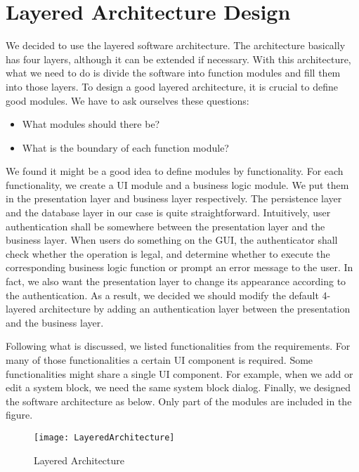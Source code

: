 \section{Layered Architecture Design}
We decided to use the layered software architecture. The architecture basically has four layers, although it can be extended if necessary. With this architecture, what we need to do is divide the software into function modules and fill them into those layers. To design a good layered architecture, it is crucial to define good modules. We have to ask ourselves these questions:
\begin{itemize}
\item What modules should there be?
\item What is the boundary of each function module?
\end{itemize}

We found it might be a good idea to define modules by functionality. For each functionality, we create a UI module and a business logic module. We put them in the presentation layer and business layer respectively. The persistence layer and the database layer in our case is quite straightforward. Intuitively, user authentication shall be somewhere between the presentation layer and the business layer. When users do something on the GUI, the authenticator shall check whether the operation is legal, and determine whether to execute the corresponding business logic function or prompt an error message to the user. In fact, we also want the presentation layer to change its appearance according to the authentication. As a result, we decided we should modify the default 4-layered architecture by adding an authentication layer between the presentation and the business layer.

Following what is discussed, we listed functionalities from the requirements. For many of those functionalities a certain UI component is required. Some functionalities might share a single UI component. For example, when we add or edit a system block, we need the same system block dialog. Finally, we designed the software architecture as below. Only part of the modules are included in the figure.

\begin{figure}[htbp]
\centering
\texttt{[image: LayeredArchitecture]}
\caption{Layered Architecture\label{fig:Layered Architecture}}
\end{figure}

